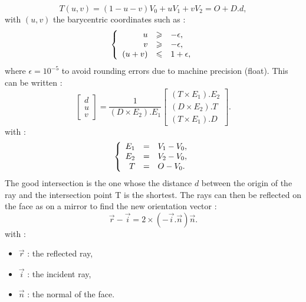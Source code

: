 \documentclass[AMA,STIX1COL]{WileyNJD-v2}
\begin{document}
\begin{equation} \label{eq_2moller}
T(u,v) = (1-u-v)V_0 + uV_1 + vV_2 = O + D.d,%
\end{equation}
%
with $(u,v)$ the barycentric coordinates such as :
\begin{equation}
   \left \{
   \begin{array}{r c l}
u & \geqslant & -\epsilon,  \\
v & \geqslant & -\epsilon,  \\
(u+v) & \leqslant & 1+\epsilon,
   \end{array}
   \right .
\end{equation}
where $\epsilon = 10^{-5}$ to avoid rounding errors due to machine precision (float). This can be written : 
\begin{equation}
	\begin{bmatrix}
 	 d \\
	 u \\
	 v
	\end{bmatrix}
	=
	\frac{1}{
 	  (D \times E_2).E_1
	}
	\begin{bmatrix}
 		  (T \times E_1).E_2
 \\ 
 		  (D \times E_2).T
 \\
 		  (T \times E_1).D
	\end{bmatrix}	.
\end{equation}
with : 
\begin{equation}
   \left \{
   \begin{array}{r c l}
E_1 &=&  V_1-V_0,  \\
E_2 &=&  V_2-V_0,  \\
T &=& O - V_0.
   \end{array}
   \right .
\end{equation}
%
The good intersection is the one whose the distance $d$ between the origin of the ray and the intersection point T is the shortest. The rays can then be reflected on the face as on a mirror to find the new orientation vector :%
\begin{equation}
\overrightarrow{r} - \overrightarrow{i} = 2 \times (-\overrightarrow{i}.\overrightarrow{n})\overrightarrow{n}.
\end{equation}
with : 
\begin{itemize}
\item $\overrightarrow{r}$ : the reflected ray,
\item $\overrightarrow{i}$ : the incident ray,
\item $\overrightarrow{n}$ : the normal of the face.
\end{itemize}
\end{document}
